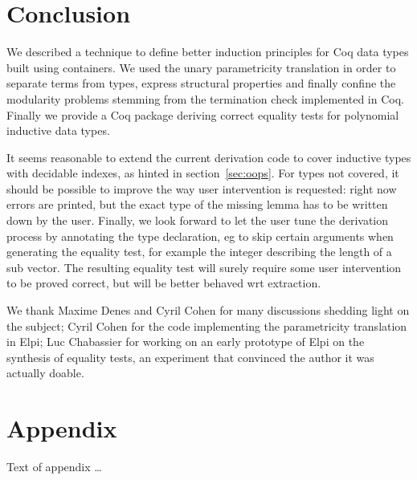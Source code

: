 \documentclass[sigplan,10pt,review]{acmart}\settopmatter{printfolios=true,printccs=false,printacmref=false}
\begin{document}
\section{Conclusion} %
\label{sec:conclusion}

We described a technique to define better induction principles
for Coq data types built using containers. We used the unary
parametricity translation in order to separate terms from types,
express structural properties and finally confine the modularity
problems stemming from the termination check implemented in Coq.
Finally we provide a Coq package deriving correct equality tests
for polynomial inductive data types.

It seems reasonable to extend the current derivation code to cover
inductive types with decidable indexes, as hinted in
section~\ref{sec:oops}. For types not covered, it should be possible
to improve the way user intervention is requested: right now errors
are printed, but the exact type of the missing lemma has to be written
down by the user.
Finally, we look forward to let the user tune
the derivation process by annotating the type declaration, eg to skip
certain arguments when generating the equality test, for example the
integer describing the length of a sub vector. The resulting equality
test will surely require some user intervention to be proved correct,
but will be better behaved wrt extraction.

\begin{acks}
We thank Maxime Denes and Cyril Cohen for many discussions shedding light
on the subject; Cyril Cohen for the code implementing the parametricity
translation in Elpi; Luc Chabassier for working on an early prototype of
Elpi on the synthesis of equality tests, an experiment that convinced
the author it was actually doable.
\end{acks}





\appendix
\section{Appendix}

Text of appendix \ldots
\end{document}
